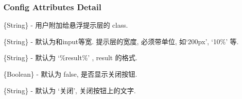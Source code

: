 \documentclass[letterpaper,10pt,english]{sphinxmanual}
\begin{document}
\subsubsection{Config Attributes Detail}
\label{api/component/suggest/index:config-attributes-detail}

\begin{fulllineitems}
\label{api/component/suggest/index:Suggest.containerCls}
\{String\} - 用户附加给悬浮提示层的 class.

\end{fulllineitems}



\begin{fulllineitems}
\label{api/component/suggest/index:Suggest.containerWidth}
\{String\} - 默认为和input等宽. 提示层的宽度, 必须带单位, 如`200px', `10\%' 等.

\end{fulllineitems}



\begin{fulllineitems}
\label{api/component/suggest/index:Suggest.resultFormat}
\{String\} - 默认为 `\%result\%' ,  result 的格式.

\end{fulllineitems}



\begin{fulllineitems}
\label{api/component/suggest/index:Suggest.closeBtn}
\{Boolean\} - 默认为 false, 是否显示关闭按钮.

\end{fulllineitems}



\begin{fulllineitems}
\label{api/component/suggest/index:Suggest.closeBtnText}
\{String\} - 默认为 `关闭', 关闭按钮上的文字.

\end{fulllineitems}


\end{document}
